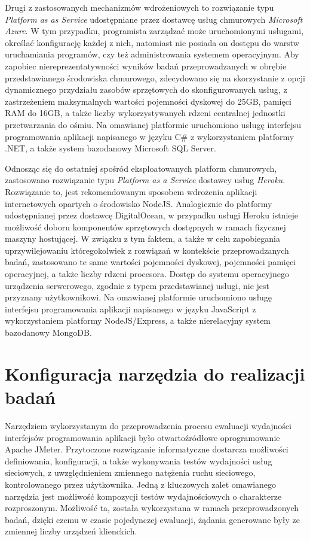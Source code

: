 Drugi z zastosowanych mechanizmów wdrożeniowych to rozwiązanie typu \textit{Platform as as Service} udostępniane przez dostawcę usług chmurowych \textit{Microsoft Azure}. W tym przypadku, programista zarządzać może uruchomionymi usługami, określać konfigurację każdej z nich, natomiast nie posiada on dostępu do warstw uruchamiania programów, czy też administrowania systemem operacyjnym. Aby zapobiec niereprezentatywności wyników badań przeprowadzanych w obrębie przedstawianego środowiska chmurowego, zdecydowano się na skorzystanie z opcji dynamicznego przydziału zasobów sprzętowych do skonfigurowanych usług, z zastrzeżeniem maksymalnych wartości pojemności dyskowej do 25GB, pamięci RAM do 16GB, a także liczby wykorzystywanych rdzeni centralnej jednostki przetwarzania do ośmiu. Na omawianej platformie uruchomiono usługę interfejsu programowania aplikacji napisanego w języku C\# z wykorzystaniem platformy .NET, a także system bazodanowy Microsoft SQL Server.

Odnosząc się do ostatniej spośród eksploatowanych platform chmurowych, zastosowano rozwiązanie typu \textit{Platform as a Service} dostawcy usług \textit{Heroku}. Rozwiązanie to, jest rekomendowanym sposobem wdrożenia aplikacji internetowych opartych o środowisko NodeJS. Analogicznie do platformy udostępnianej przez dostawcę DigitalOcean, w przypadku usługi Heroku istnieje możliwość doboru komponentów sprzętowych dostępnych w ramach fizycznej maszyny hostującej. W związku z tym faktem, a także w celu zapobiegania uprzywilejowaniu któregokolwiek z rozwiązań w kontekście przeprowadzanych badań, zastosowano te same wartości pojemności dyskowej, pojemności pamięci operacyjnej, a także liczby rdzeni procesora. Dostęp do systemu operacyjnego urządzenia serwerowego, zgodnie z typem przedstawianej usługi, nie jest przyznany użytkownikowi. Na omawianej platformie uruchomiono usługę interfejsu programowania aplikacji napisanego w języku JavaScript z wykorzystaniem platformy NodeJS/Express, a także nierelacyjny system bazodanowy MongoDB.
\section{Konfiguracja narzędzia do realizacji badań}
Narzędziem wykorzystanym do przeprowadzenia procesu ewaluacji wydajności interfejsów programowania aplikacji było otwartoźródłowe oprogramowanie Apache JMeter. Przytoczone rozwiązanie informatyczne dostarcza możliwości definiowania, konfiguracji, a także wykonywania testów wydajności usług sieciowych, z uwzględnieniem zmiennego natężenia ruchu sieciowego, kontrolowanego przez użytkownika. Jedną z kluczowych zalet omawianego narzędzia jest możliwość kompozycji testów wydajnościowych o charakterze rozproszonym. Możliwość ta, została wykorzystana w ramach przeprowadzonych badań, dzięki czemu w czasie pojedynczej ewaluacji, żądania generowane były ze zmiennej liczby urządzeń klienckich.

